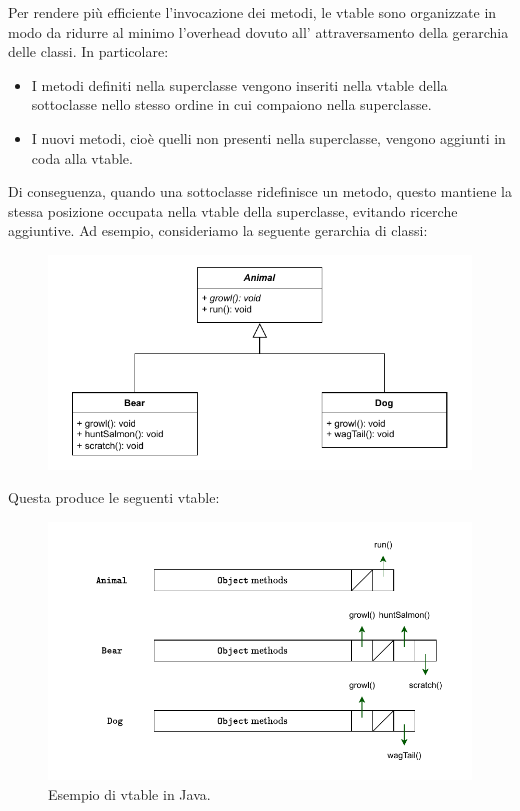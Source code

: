 Per rendere più efficiente l'invocazione dei metodi, le vtable sono organizzate in modo da ridurre al minimo l'overhead dovuto all' attraversamento della gerarchia delle classi. In particolare:
\begin{itemize}
    \item I metodi definiti nella superclasse vengono inseriti nella vtable della sottoclasse nello stesso ordine in cui compaiono nella superclasse.
    \item I nuovi metodi, cioè quelli non presenti nella superclasse, vengono aggiunti in coda alla vtable.
\end{itemize}
Di conseguenza, quando una sottoclasse ridefinisce un metodo, questo mantiene la stessa posizione occupata nella vtable della superclasse, evitando ricerche aggiuntive. Ad esempio, consideriamo la seguente gerarchia di classi:
\begin{figure}[H]
    \centering
    \includegraphics[width=1\textwidth]{Figures/uml1.drawio.pdf}
\end{figure}
Questa produce le seguenti vtable:
\begin{figure}[H]
    \centering
    \includegraphics[width=\textwidth]{Figures/vtable1.drawio.pdf}
    \caption{Esempio di vtable in Java.}
    \label{fig:vtable_java}
\end{figure}

